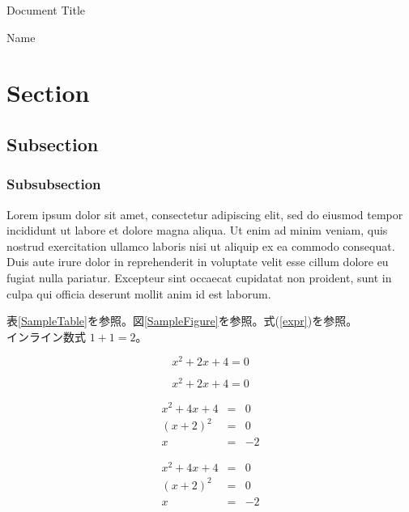 \documentclass[dvipdfmx,12pt]{ujarticle}
\begin{document}
\begin{center}
    {\Large Document Title}
\end{center}

\begin{flushright}
    Name
\end{flushright}

\section{Section}
\subsection{Subsection}
\subsubsection{Subsubsection}

Lorem ipsum dolor sit amet, consectetur adipiscing elit, sed do eiusmod tempor incididunt ut labore et dolore magna aliqua. Ut enim ad minim veniam, quis nostrud exercitation ullamco laboris nisi ut aliquip ex ea commodo consequat. Duis aute irure dolor in reprehenderit in voluptate velit esse cillum dolore eu fugiat nulla pariatur. Excepteur sint occaecat cupidatat non proident, sunt in culpa qui officia deserunt mollit anim id est laborum.

表\ref{SampleTable}を参照。図\ref{SampleFigure}を参照。式(\ref{expr})を参照。\\インライン数式 $ 1 + 1 = 2 $。


\begin{equation}
    \label{expr}
    x^2 + 2x + 4 = 0
\end{equation}

\begin{displaymath}
    x^2 + 2x + 4 = 0
\end{displaymath}

\begin{eqnarray}
    x ^ 2 + 4x + 4 &=& 0 \nonumber \\
    (x + 2) ^ 2 &=& 0 \nonumber \\
    x &=& -2
\end{eqnarray}

\begin{eqnarray*}
    x ^ 2 + 4x + 4 &=& 0 \\
    (x + 2) ^ 2 &=& 0 \\
    x &=& -2
\end{eqnarray*}
\end{document}
